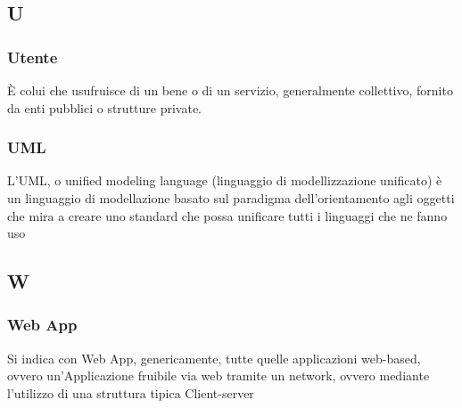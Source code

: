 	\subsection{U}
		\subsubsection{Utente}
			È colui che usufruisce di un bene o di un servizio, generalmente collettivo, fornito da enti pubblici o strutture private.
		\subsubsection{UML}
			L'UML, o unified modeling language (linguaggio di modellizzazione unificato) è un linguaggio di modellazione basato sul paradigma dell'orientamento agli oggetti
		che mira a creare uno standard che possa unificare tutti i linguaggi che ne fanno uso
	\subsection{W}
		\subsubsection{Web App}
			Si indica con Web App, genericamente, tutte quelle applicazioni web-based, ovvero un’Applicazione
			fruibile via web tramite un network, ovvero mediante l’utilizzo di una struttura tipica Client-server


	
